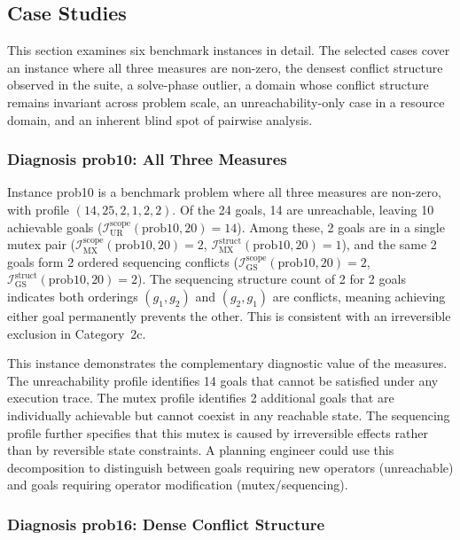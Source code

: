\subsection{Case Studies}
\label{sec:eval_case_studies}

This section examines six benchmark instances in detail. The selected cases cover an instance where all three measures are non-zero, the densest conflict structure observed in the suite, a solve-phase outlier, a domain whose conflict structure remains invariant across problem scale, an unreachability-only case in a resource domain, and an inherent blind spot of pairwise analysis.

\subsubsection{Diagnosis prob10: All Three Measures}

Instance prob10 is a benchmark problem where all three measures are non-zero, with profile $(14, 25, 2, 1, 2, 2)$. Of the 24 goals, 14 are unreachable, leaving 10 achievable goals ($\mathcal{I}^{\text{scope}}_{\text{UR}}(\text{prob10}, 20) = 14$). Among these, 2 goals are in a single mutex pair ($\mathcal{I}^{\text{scope}}_{\text{MX}}(\text{prob10}, 20) = 2$, $\mathcal{I}^{\text{struct}}_{\text{MX}}(\text{prob10}, 20) = 1$), and the same 2 goals form 2 ordered sequencing conflicts ($\mathcal{I}^{\text{scope}}_{\text{GS}}(\text{prob10}, 20) = 2$, $\mathcal{I}^{\text{struct}}_{\text{GS}}(\text{prob10}, 20) = 2$). The sequencing structure count of 2 for 2 goals indicates both orderings $(g_1, g_2)$ and $(g_2, g_1)$ are conflicts, meaning achieving either goal permanently prevents the other. This is consistent with an irreversible exclusion in Category~2c.

This instance demonstrates the complementary diagnostic value of the measures. The unreachability profile identifies 14 goals that cannot be satisfied under any execution trace. The mutex profile identifies 2 additional goals that are individually achievable but cannot coexist in any reachable state. The sequencing profile further specifies that this mutex is caused by irreversible effects rather than by reversible state constraints. A planning engineer could use this decomposition to distinguish between goals requiring new operators (unreachable) and goals requiring operator modification (mutex/sequencing).

\subsubsection{Diagnosis prob16: Dense Conflict Structure}

